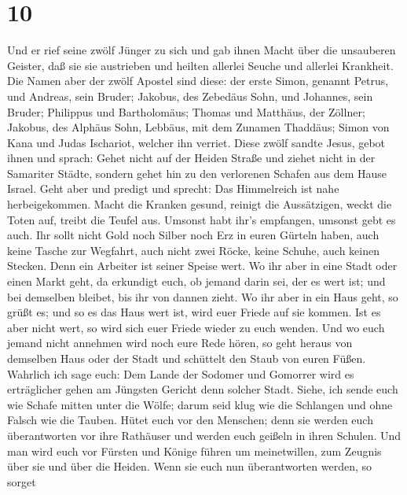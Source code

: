 \hypertarget{section-9}{%
\section{10}\label{section-9}}

 Und er rief seine zwölf Jünger zu sich und gab ihnen Macht
über die unsauberen Geister, daß sie sie austrieben und heilten allerlei
Seuche und allerlei Krankheit.  Die Namen aber der zwölf
Apostel sind diese: der erste Simon, genannt Petrus, und Andreas, sein
Bruder; Jakobus, des Zebedäus Sohn, und Johannes, sein Bruder;
 Philippus und Bartholomäus; Thomas und Matthäus, der
Zöllner; Jakobus, des Alphäus Sohn, Lebbäus, mit dem Zunamen Thaddäus;
 Simon von Kana und Judas Ischariot, welcher ihn verriet.
 Diese zwölf sandte Jesus, gebot ihnen und sprach: Gehet
nicht auf der Heiden Straße und ziehet nicht in der Samariter Städte,
 sondern gehet hin zu den verlorenen Schafen aus dem Hause
Israel.  Geht aber und predigt und sprecht: Das Himmelreich
ist nahe herbeigekommen.  Macht die Kranken gesund, reinigt
die Aussätzigen, weckt die Toten auf, treibt die Teufel aus. Umsonst
habt ihr's empfangen, umsonst gebt es auch.  Ihr sollt nicht
Gold noch Silber noch Erz in euren Gürteln haben,  auch
keine Tasche zur Wegfahrt, auch nicht zwei Röcke, keine Schuhe, auch
keinen Stecken. Denn ein Arbeiter ist seiner Speise wert. 
Wo ihr aber in eine Stadt oder einen Markt geht, da erkundigt euch, ob
jemand darin sei, der es wert ist; und bei demselben bleibet, bis ihr
von dannen zieht.  Wo ihr aber in ein Haus geht, so grüßt
es;  und so es das Haus wert ist, wird euer Friede auf sie
kommen. Ist es aber nicht wert, so wird sich euer Friede wieder zu euch
wenden.  Und wo euch jemand nicht annehmen wird noch eure
Rede hören, so geht heraus von demselben Haus oder der Stadt und
schüttelt den Staub von euren Füßen.  Wahrlich ich sage
euch: Dem Lande der Sodomer und Gomorrer wird es erträglicher gehen am
Jüngsten Gericht denn solcher Stadt.  Siehe, ich sende euch
wie Schafe mitten unter die Wölfe; darum seid klug wie die Schlangen und
ohne Falsch wie die Tauben.  Hütet euch vor den Menschen;
denn sie werden euch überantworten vor ihre Rathäuser und werden euch
geißeln in ihren Schulen.  Und man wird euch vor Fürsten
und Könige führen um meinetwillen, zum Zeugnis über sie und über die
Heiden.  Wenn sie euch nun überantworten werden, so sorget
